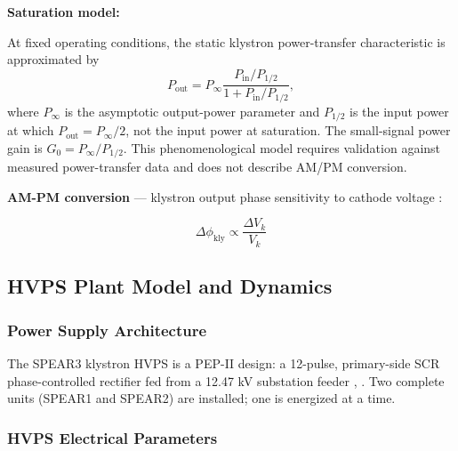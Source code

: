 \textbf{Saturation model:} 

At fixed operating conditions, the static klystron power-transfer characteristic is approximated by 
\begin{equation}\label{eq:kly-sat} 
  P_{\mathrm{out}} = P_{\infty} \frac{P_{\mathrm{in}}/P_{1/2}} {1 + P_{\mathrm{in}}/P_{1/2}}, 
\end{equation} 
where $P_{\infty}$ is the asymptotic output-power parameter and $P_{1/2}$ is the input power at which $P_{\mathrm{out}}=P_{\infty}/2$, not the input power at saturation. The small-signal power gain is $G_0=P_{\infty}/P_{1/2}$. This phenomenological model requires validation against measured power-transfer data and does not describe AM/PM conversion.

\textbf{AM-PM conversion} --- klystron output phase sensitivity to cathode voltage :

\begin{equation}\label{eq:kly-ampm}
\Delta\phi_\text{kly} \propto \frac{\Delta V_k}{V_k}
\end{equation}

\subsection{HVPS Plant Model and Dynamics}\label{sec:hvps}


\subsubsection{Power Supply Architecture}\label{sec:hvps-arch}


The SPEAR3 klystron HVPS is a PEP-II design: a 12-pulse, primary-side SCR phase-controlled rectifier fed from a 12.47 kV substation feeder , . Two complete units (SPEAR1 and SPEAR2) are installed; one is energized at a time.

\subsubsection{HVPS Electrical Parameters}\label{sec:hvps-params}


